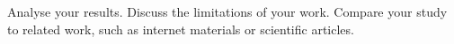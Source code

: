 Analyse your results. Discuss the limitations of your work. Compare
your study to related work, such as internet materials or scientific articles.
